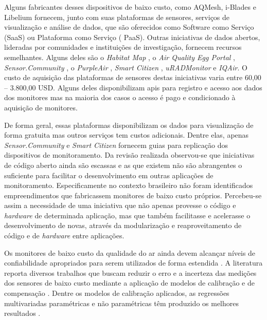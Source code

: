 Alguns fabricantes desses dispositivos de baixo custo, como AQMesh, i-Blades e Libelium fornecem, junto com suas plataformas de sensores, serviços de visualização e análise de dados, que são oferecidos como Software como Serviço (SaaS) ou Plataforma como Serviço ( PaaS). Outras iniciativas de dados abertos, lideradas por comunidades e instituições de investigação, fornecem recursos semelhantes. Alguns deles são o \textit{Habitat Map} \cite{HabitatMap2023AirCasting}, o \textit{Air Quality Egg Portal} \cite{AirQualityEgg2023AirPortal}, \textit{Sensor.Community} \cite{Sensor.Community2023LuftMap}, o \textit{PurpleAir} \cite{PurpleAir2023PurpleAirMonitoring}, \textit{Smart Citizen} \cite{SmartCitizen2023SmartCitizen}, \textit{uRADMonitor} \cite{uRADMonitor2023PM2.5URADMonitor} e \textit{IQAir}. O custo de aquisição das plataformas de sensores destas iniciativas varia entre 60,00 – 3.800,00 USD. Alguns deles disponibilizam \acrshort{api}s para registro e acesso aos dados dos monitores mas na maioria dos casos o acesso é pago e condicionado à aquisição de monitores. 

De forma geral, essas plataformas disponibilizam os dados para visualização de forma gratuita mas outros serviços tem custos adicionais. Dentre elas, apenas \textit{Sensor.Community} e \textit{Smart Citizen} fornecem guias para replicação dos dispositivos de monitoramento. Da revisão realizada observou-se que iniciativas de código aberto ainda são escassas e as que existem não são abrangentes o suficiente para facilitar o desenvolvimento em outras aplicações de monitoramento. Especificamente no contexto brasileiro não foram identificados empreendimentos que fabricassem monitores de baixo custo próprios. Percebeu-se assim a necessidade de uma iniciativa que não apenas provesse o código e \textit{hardware} de determinada aplicação, mas que também facilitasse e acelerasse o desenvolvimento de novas, através da modularização e reaproveitamento de código e de \textit{hardware} entre aplicações.

Os monitores de baixo custo da qualidade do ar ainda devem alcançar níveis de confiabilidade apropriados para serem utilizados de forma estendida \cite{Penza2020Low-costMonitoring}. A literatura reporta diversos trabalhos que buscam reduzir o erro e a incerteza das medições dos sensores de baixo custo mediante a aplicação de modelos de calibração e de compensação \cite{Maag2018ADeployments, Concas2021LOW-COSTPREPRINT}. Dentre os modelos de calibração aplicados, as regressões multivariadas paramétricas e não paramétricas têm produzido os melhores resultados \cite{Feng2019ReviewTechnology,Concas2021LOW-COSTPREPRINT}.

